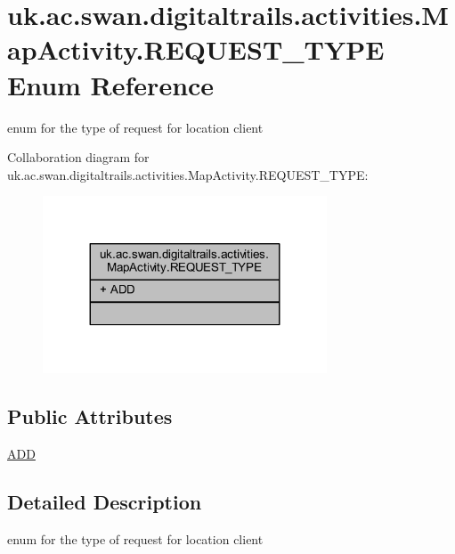 \hypertarget{enumuk_1_1ac_1_1swan_1_1digitaltrails_1_1activities_1_1_map_activity_1_1_r_e_q_u_e_s_t___t_y_p_e}{\section{uk.\+ac.\+swan.\+digitaltrails.\+activities.\+Map\+Activity.\+R\+E\+Q\+U\+E\+S\+T\+\_\+\+T\+Y\+P\+E Enum Reference}
\label{enumuk_1_1ac_1_1swan_1_1digitaltrails_1_1activities_1_1_map_activity_1_1_r_e_q_u_e_s_t___t_y_p_e}
}


enum for the type of request for location client  




Collaboration diagram for uk.\+ac.\+swan.\+digitaltrails.\+activities.\+Map\+Activity.\+R\+E\+Q\+U\+E\+S\+T\+\_\+\+T\+Y\+P\+E\+:
\nopagebreak
\begin{figure}[H]
\begin{center}
\leavevmode
\includegraphics[width=239pt]{enumuk_1_1ac_1_1swan_1_1digitaltrails_1_1activities_1_1_map_activity_1_1_r_e_q_u_e_s_t___t_y_p_e__coll__graph}
\end{center}
\end{figure}
\subsection*{Public Attributes}
\begin{DoxyCompactItemize}
\item 
\hyperlink{enumuk_1_1ac_1_1swan_1_1digitaltrails_1_1activities_1_1_map_activity_1_1_r_e_q_u_e_s_t___t_y_p_e_aa29be13c973a663e296ea42a862b9659}{A\+D\+D}
\end{DoxyCompactItemize}


\subsection{Detailed Description}
enum for the type of request for location client 

